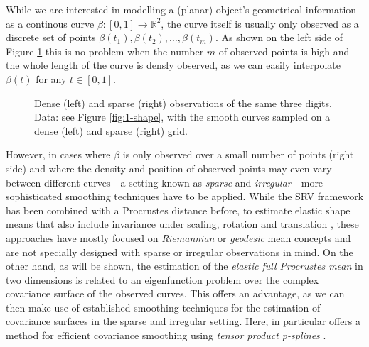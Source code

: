 While we are interested in modelling a (planar) object's geometrical information as a continous curve $\beta : [0,1] \rightarrow \mathbb{R}^2$, the curve itself is usually only observed as a discrete set of points $\beta(t_1), \beta(t_2), \dots, \beta(t_m)$.
As shown on the left side of Figure \ref{fig:1-sparse} this is no problem when the number $m$ of observed points is high and the whole length of the curve is densly observed, as we can easily interpolate $\beta(t)$ for any $t \in [0,1]$.
\begin{figure}
  \centering
  \begin{subfigure}{.48\textwidth}
    \centering
  \end{subfigure}\hfill%
  \begin{subfigure}{.48\textwidth}
    \centering
  \end{subfigure}
  \caption{Dense (left) and sparse (right) observations of the same three digits. Data: see Figure \ref{fig:1-shape}, with the smooth curves sampled on a dense (left) and sparse (right) grid.}
  \label{fig:1-sparse}
\end{figure}
However, in cases where $\beta$ is only observed over a small number of points (right side) and where the density and position of observed points may even vary between different curves---a setting known as \emph{sparse} and \emph{irregular}---more sophisticated smoothing techniques have to be applied.
While the SRV framework has been combined with a Procrustes distance before, to estimate elastic shape means that also include invariance under scaling, rotation and translation \parencite[see][]{SrivastavaEtAl2011}, these approaches have mostly focused on \emph{Riemannian} or \emph{geodesic} mean concepts and are not specially designed with sparse or irregular observations in mind.
On the other hand, as will be shown, the estimation of the \emph{elastic full Procrustes mean} in two dimensions is related to an eigenfunction problem over the complex covariance surface of the observed curves.
This offers an advantage, as we can then make use of established smoothing techniques for the estimation of covariance surfaces in the sparse and irregular setting.
Here, in particular \cite{CederbaumScheiplGreven2018} offers a method for efficient covariance smoothing using \emph{tensor product p-splines} \parencite[see e.g.][Chap. 8.2]{FahrmeierEtAl2013}.


